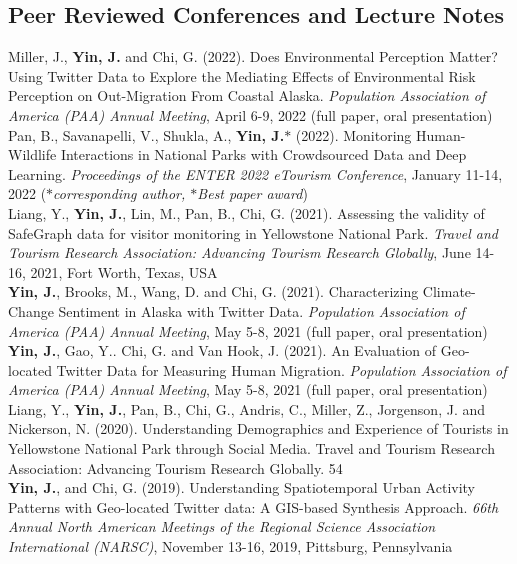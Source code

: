 \documentclass[11pt, a4paper]{article}
\newcommand{\years}[1]{\marginnote{\scriptsize #1}}
\begin{document}
\subsection*{Peer Reviewed Conferences and Lecture Notes}
\noindent
\years{2022}Miller, J., \textbf{Yin, J.} and Chi, G. (2022). Does Environmental Perception Matter? Using Twitter Data to Explore the Mediating Effects of Environmental Risk Perception on Out-Migration From Coastal Alaska. \textit{Population Association of America (PAA) Annual Meeting}, April 6-9, 2022 (full paper, oral presentation)\\
\years{2022}Pan, B., Savanapelli, V., Shukla, A., \textbf{Yin, J.$*$} (2022). Monitoring Human-Wildlife Interactions in National Parks with Crowdsourced Data and Deep Learning. \textit{ Proceedings of the ENTER 2022 eTourism Conference}, January 11-14, 2022 (\textit{$*$corresponding author, \emph{$*$Best paper award}})\\
\years{2021}Liang, Y., \textbf{Yin, J.}, Lin, M., Pan, B., Chi, G. (2021). Assessing the validity of SafeGraph data for visitor monitoring in Yellowstone National Park. \textit{ Travel and Tourism Research Association: Advancing Tourism Research Globally}, June 14-16, 2021, Fort Worth, Texas, USA\\
\years{2021}\textbf{Yin, J.},  Brooks, M., Wang, D. and Chi, G. (2021). Characterizing Climate-Change Sentiment in Alaska with Twitter Data. \textit{Population Association of America (PAA) Annual Meeting}, May 5-8, 2021 (full paper, oral presentation)\\
\years{2021}\textbf{Yin, J.}, Gao, Y.. Chi, G. and Van Hook, J. (2021). An Evaluation of Geo-located Twitter Data for Measuring Human Migration. \textit{Population Association of America (PAA) Annual Meeting}, May 5-8, 2021 (full paper, oral presentation)\\
\years{2020}Liang, Y., \textbf{Yin, J.}, Pan, B., Chi, G., Andris, C., Miller, Z., Jorgenson, J. and Nickerson, N. (2020). Understanding Demographics and Experience of Tourists in Yellowstone National Park through Social Media. Travel and Tourism Research Association: Advancing Tourism Research Globally. 54 \\
\years{2019}\textbf{Yin, J.}, and Chi, G. (2019). Understanding Spatiotemporal Urban Activity Patterns with Geo-located Twitter data: A GIS-based Synthesis Approach. \textit{66th Annual North American Meetings of the Regional Science Association International (NARSC)}, November 13-16, 2019, Pittsburg, Pennsylvania\\
\end{document}
